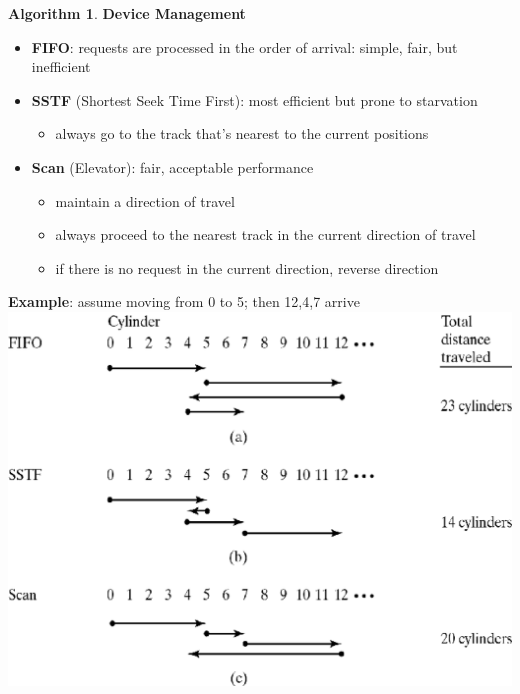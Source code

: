 \documentclass[11pt,a4paper]{article}
\theoremstyle{definition}
\newtheorem{algoalgorithm}{Algorithm}[section]
\newenvironment{myitemize}
{ \begin{itemize}
    \setlength{\itemsep}{5pt}
    \setlength{\parskip}{0pt}
    \setlength{\parsep}{0pt}     }
{ \end{itemize}                  }
\begin{document}
\begin{algoalgorithm}{\textbf{Device Management}}

	\begin{minipage}{0.55\linewidth}
		\begin{myitemize}
		\item \textbf{FIFO}: requests are processed in the order of arrival: simple, fair, but inefficient
		\item \textbf{SSTF} (Shortest Seek Time First): most efficient but prone to starvation
		\begin{myitemize}
			\item always go to the track that’s nearest to the current positions
		\end{myitemize} 
		\item \textbf{Scan} (Elevator): fair, acceptable performance
		\begin{myitemize}
			\item maintain a direction of travel
			\item always proceed to the nearest track in the current direction of travel
			\item if there is no request in the current direction, reverse direction
		\end{myitemize}
	\end{myitemize}
	\end{minipage}\hspace{5mm}
	\begin{minipage}{0.4\linewidth}
	
		\textbf{Example}: assume moving from 0 to 5; then 12,4,7 arrive
		\includegraphics[width=\linewidth]{m3/deviceManagementAlgo}
	\end{minipage}
	
\end{algoalgorithm}
\end{document}
